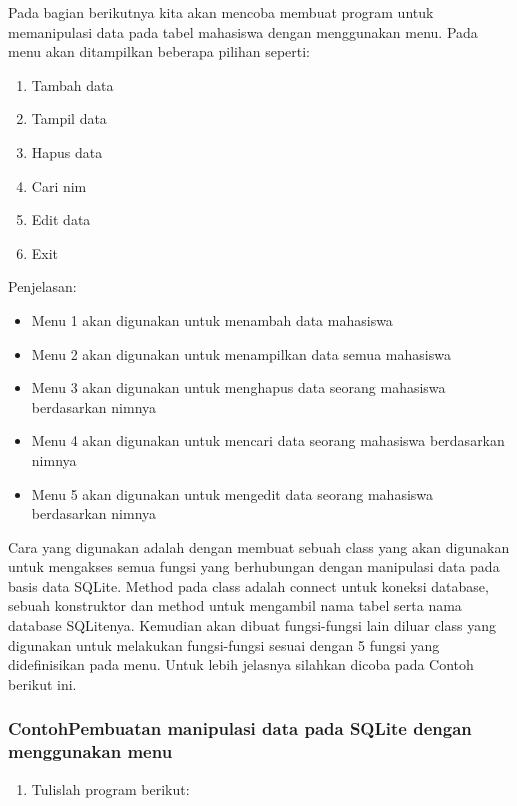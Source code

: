Pada bagian berikutnya kita akan mencoba membuat program untuk
memanipulasi data pada tabel mahasiswa dengan menggunakan menu. Pada
menu akan ditampilkan beberapa pilihan seperti:

\begin{enumerate}


\item
Tambah data
\item
Tampil data
\item
Hapus data
\item
Cari nim
\item
Edit data
\item
Exit
\end{enumerate}

Penjelasan:

\begin{itemize}

\item
Menu 1 akan digunakan untuk menambah data mahasiswa
\item
Menu 2 akan digunakan untuk menampilkan data semua mahasiswa
\item
Menu 3 akan digunakan untuk menghapus data seorang mahasiswa
berdasarkan nimnya
\item
Menu 4 akan digunakan untuk mencari data seorang mahasiswa berdasarkan
nimnya
\item
Menu 5 akan digunakan untuk mengedit data seorang mahasiswa
berdasarkan nimnya
\end{itemize}

Cara yang digunakan adalah dengan membuat sebuah class yang akan
digunakan untuk mengakses semua fungsi yang berhubungan dengan
manipulasi data pada basis data SQLite. Method pada class adalah connect
untuk koneksi database, sebuah konstruktor dan method untuk mengambil
nama tabel serta nama database SQLitenya. Kemudian akan dibuat
fungsi-fungsi lain diluar class yang digunakan untuk melakukan
fungsi-fungsi sesuai dengan 5 fungsi yang didefinisikan pada menu. Untuk
lebih jelasnya silahkan dicoba pada Contoh berikut ini.

\subsubsection*{ContohPembuatan manipulasi data pada SQLite dengan menggunakan menu}

\begin{enumerate}

\item
Tulislah program berikut:


\end{enumerate}

